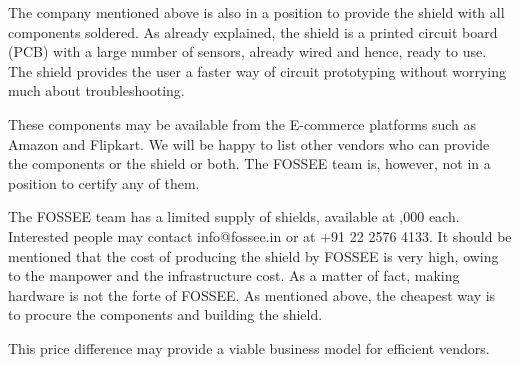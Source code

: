 The company mentioned above is also in a position to provide the
shield with all components soldered.  As already explained, the shield
is a printed circuit board (PCB) with a large number of sensors,
already wired and hence, ready to use. The shield provides the user a
faster way of circuit prototyping without worrying much about
troubleshooting.  

These components may be available from the E-commerce platforms such
as Amazon and Flipkart.  We will be happy to list other vendors who
can provide the components or the shield or both.  The FOSSEE team is,
however, not in a position to certify any of them.

The FOSSEE team has a limited supply of shields, available at
,000 each.  Interested people may contact info@fossee.in or at
+91 22 2576 4133.  It should be mentioned that the cost of producing
the shield by FOSSEE is very high, owing to the manpower and the
infrastructure cost.  As a matter of fact, making hardware is not the
forte of FOSSEE.  As mentioned above, the cheapest way is to procure
the components and building the shield.

This price difference may provide a viable business model for
efficient vendors.

